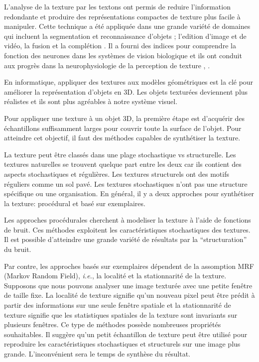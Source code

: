 L'analyse de la texture par les textons
ont permis de reduire l'information redondante et produire des 
représentations compactes de texture plus facile à manipuler.
Cette technique a été appliquée dans une grande variété de domaines qui incluent
la segmentation et reconnaissance d'objets \cite{leung2001representing} ;
l'edition d'image et de vidéo, la fusion et la complétion \cite{wexler2004space}.
Il a fourni des indices pour comprendre la fonction des neurones dans les systèmes de vision biologique
et ils ont conduit aux progrès dans la neurophysiologie
de la perception de texture \cite{olshausen1997sparse}, \cite{landy2004visual}.

En informatique, appliquer des textures aux modèles géométriques
est la clé pour améliorer la représentation d'objets en 3D.
Les objets texturées deviennent plus réalistes
et ils sont plus agréables à notre système visuel.

Pour appliquer une texture à un objet 3D, la première étape est d'acquérir
des échantillons suffisamment larges pour couvrir toute la surface de l'objet.
Pour atteindre cet objectif, il faut des méthodes capables de synthétiser la texture.

La texture peut être classés dans une plage stochastique vs structurelle.
Les textures naturelles se trouvent quelque part entre les deux car ils contient des aspects stochastiques et régulières.
Les textures structurels ont des motifs réguliers comme un sol pavé.
Les textures stochastiques n'ont pas une structure spécifique ou une organisation.
En général, il y a deux approches pour synthétiser la texture:
procédural et basé sur exemplaires.

Les approches procédurales cherchent à modeliser la texture à l'aide de fonctions de bruit.
Ces méthodes exploitent les caractéristiques stochastiques des textures.
Il est possible d'atteindre une grande variété de résultats par la ``structuration'' du bruit.

Par contre, les approches basés sur exemplaires dépendent de la assomption MRF (Markov Random Field), 
\emph{i.e.}, la localité et la stationnarité de la texture.
Supposons que nous pouvons analyser une image texturée avec une petite fenêtre de taille fixe.
La localité de texture signifie qu'un nouveau pixel peut être prédit à partir
des informations sur une seule fenêtre spatiale
et la stationnarité de texture signifie que les statistiques spatiales de la texture sont invariants
sur plusieurs fenêtres.
Ce type de méthodes possède nombreuses propriétés souhaitables.
Il suggère qu'un petit échantillon de texture peut être utilisé pour
reproduire les caractéristiques stochastiques et structurels sur une image plus grande.
L'inconvénient sera le temps de synthèse du résultat.

